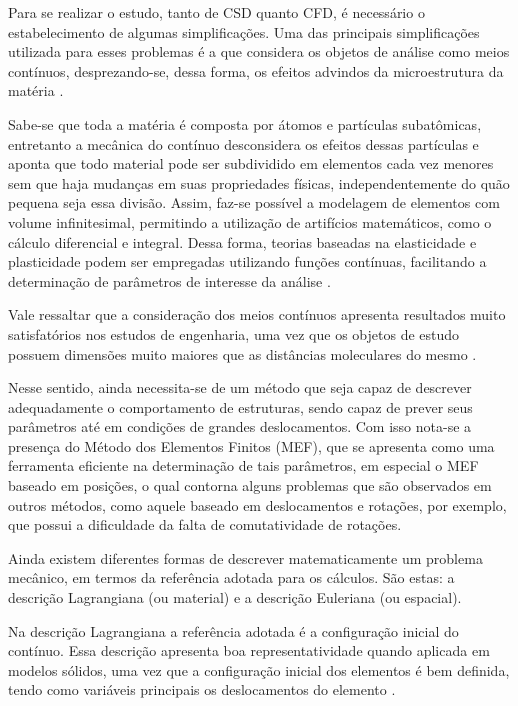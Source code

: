 Para se realizar o estudo, tanto de CSD quanto CFD, é necessário o estabelecimento de algumas simplificações. Uma das principais simplificações utilizada para esses problemas é a que considera os objetos de análise como meios contínuos, desprezando-se, dessa forma, os efeitos advindos da microestrutura da matéria \cite{lai2009introduction, mase2009continuum}.

Sabe-se que toda a matéria é composta por átomos e partículas subatômicas, entretanto a mecânica do contínuo desconsidera os efeitos dessas partículas e aponta que todo material pode ser subdividido em elementos cada vez menores sem que haja mudanças em suas propriedades físicas, independentemente do quão pequena seja essa divisão. Assim, faz-se possível a modelagem de elementos com volume infinitesimal, permitindo a utilização de artifícios matemáticos, como o cálculo diferencial e integral. Dessa forma, teorias baseadas na elasticidade e plasticidade podem ser empregadas utilizando funções contínuas, facilitando a determinação de parâmetros de interesse da análise \cite{irgens2008continuum, lai2009introduction, malvern1969introduction}.

Vale ressaltar que a consideração dos meios contínuos apresenta resultados muito satisfatórios nos estudos de engenharia, uma vez que os objetos de estudo possuem dimensões muito maiores que as distâncias moleculares do mesmo \cite{malvern1969introduction, mase2009continuum}.

Nesse sentido, ainda necessita-se de um método que seja capaz de descrever adequadamente o comportamento de estruturas, sendo capaz de prever seus parâmetros até em condições de grandes deslocamentos. Com isso nota-se a presença do Método dos Elementos Finitos (MEF), que se apresenta como uma ferramenta eficiente na determinação de tais parâmetros, em especial o MEF baseado em posições, o qual contorna alguns problemas que são observados em outros métodos, como aquele baseado em deslocamentos e rotações, por exemplo, que possui a dificuldade da falta de comutatividade de rotações.

Ainda existem diferentes formas de descrever matematicamente um problema mecânico, em termos da referência adotada para os cálculos. São estas: a descrição Lagrangiana (ou material) e a descrição Euleriana (ou espacial).

Na descrição Lagrangiana a referência adotada é a configuração inicial do contínuo. Essa descrição apresenta boa representatividade quando aplicada em modelos sólidos, uma vez que a configuração inicial dos elementos é bem definida, tendo como variáveis principais os deslocamentos do elemento \cite{sanches2014fluid, fernandes2019ale}.

